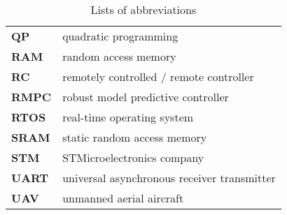 \begin{table}[!htb]
\begin{tabular}{ll}
\textbf{QP} & quadratic programming \\
\textbf{RAM} & random access memory \\
\textbf{RC} & remotely controlled / remote controller \\
\textbf{RMPC} & robust model predictive controller \\
\textbf{RTOS} & real-time operating system \\
\textbf{SRAM} & static random access memory \\
\textbf{STM} & STMicroelectronics company \\ 
\textbf{UART} & universal asynchronous receiver transmitter \\
\textbf{UAV} & unmanned aerial aircraft \\
\hline
\end{tabular}
\caption{Lists of abbreviations}
\label{table:abbreviations}
\end{table}
